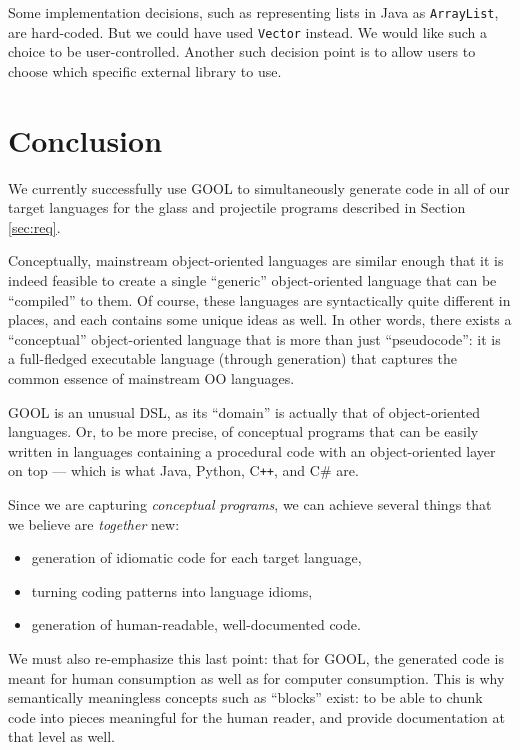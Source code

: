 \documentclass[sigplan,review,prologue,dvipsnames]{acmart}
\newcommand{\Csharp}{C\#}
\newcommand{\Cplusplus}{C\texttt{++}}
\begin{document}
Some implementation decisions, such as representing lists in Java as 
\verb|ArrayList|, are hard-coded. But we could have used \verb|Vector| instead.
We would like such a choice to be user-controlled. Another such decision
point is to allow users to choose which specific external library to use.

\section{Conclusion} \label{sec:conclusions}

We currently successfully use GOOL to simultaneously generate code in all of 
our target languages for the glass and projectile programs described in Section 
\ref{sec:req}. 

Conceptually, mainstream object-oriented languages are similar enough that it
is indeed feasible to create a single ``generic'' object-oriented language that
can be ``compiled'' to them.  Of course, these languages are syntactically
quite different in places, and each contains some unique ideas as well.
In other words, there exists a ``conceptual'' object-oriented language that
is more than just ``pseudocode'': it is a full-fledged executable language
(through generation) that captures the common essence of mainstream OO
languages.

GOOL is an unusual DSL, as its ``domain'' is actually that of object-oriented
languages. Or, to be more precise, of conceptual programs that can be
easily written in languages containing a procedural code with an
object-oriented layer on top --- which is what Java, Python, \Cplusplus{}, and
\Csharp{} are.

Since we are capturing \emph{conceptual programs}, we can achieve
several things that we believe are \emph{together} new:
\begin{itemize}
\item generation of idiomatic code for each target language,
\item turning coding patterns into language idioms,
\item generation of human-readable, well-documented code.
\end{itemize}

We must also re-emphasize this last point: that for GOOL, the generated code
is meant for human consumption as well as for computer consumption. This is
why semantically meaningless concepts such as ``blocks'' exist: to be able
to chunk code into pieces meaningful for the human reader, and provide
documentation at that level as well.
\end{document}
